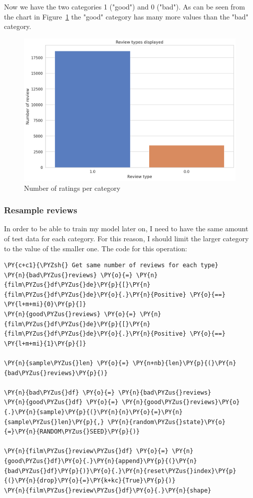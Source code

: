 Now we have the two categories 1 ("good") and 0 ("bad"). As can be seen from the chart in Figure~\ref{fig:fig_04}  the "good" category has many more values than the "bad" category.

\begin{figure}[H]
\centering
\includegraphics[width=1\textwidth]{images/output_43_1.png}
\caption{Number of ratings per category}
\label{fig:fig_04}
\end{figure}
\FloatBarrier
\subsubsection{Resample reviews}
\label{chap:resample}
In order to be able to train my model later on, I need to have the same amount of test data for each category. For this reason, I should limit the larger category to the value of the smaller one.
The code for this operation:
        \begin{tcolorbox}[breakable, size=fbox, boxrule=1pt, pad at break*=1mm,colback=cellbackground, colframe=cellborder]
\begin{Verbatim}[commandchars=\\\{\},fontsize=\footnotesize]
\PY{c+c1}{\PYZsh{} Get same number of reviews for each type}
\PY{n}{bad\PYZus{}reviews} \PY{o}{=} \PY{n}{film\PYZus{}df\PYZus{}de}\PY{p}{[}\PY{n}{film\PYZus{}df\PYZus{}de}\PY{o}{.}\PY{n}{Positive} \PY{o}{==} \PY{l+m+mi}{0}\PY{p}{]}
\PY{n}{good\PYZus{}reviews} \PY{o}{=} \PY{n}{film\PYZus{}df\PYZus{}de}\PY{p}{[}\PY{n}{film\PYZus{}df\PYZus{}de}\PY{o}{.}\PY{n}{Positive} \PY{o}{==} \PY{l+m+mi}{1}\PY{p}{]}

\PY{n}{sample\PYZus{}len} \PY{o}{=} \PY{n+nb}{len}\PY{p}{(}\PY{n}{bad\PYZus{}reviews}\PY{p}{)}

\PY{n}{bad\PYZus{}df} \PY{o}{=} \PY{n}{bad\PYZus{}reviews}
\PY{n}{good\PYZus{}df} \PY{o}{=} \PY{n}{good\PYZus{}reviews}\PY{o}{.}\PY{n}{sample}\PY{p}{(}\PY{n}{n}\PY{o}{=}\PY{n}{sample\PYZus{}len}\PY{p}{,} \PY{n}{random\PYZus{}state}\PY{o}{=}\PY{n}{RANDOM\PYZus{}SEED}\PY{p}{)}

\PY{n}{film\PYZus{}review\PYZus{}df} \PY{o}{=} \PY{n}{good\PYZus{}df}\PY{o}{.}\PY{n}{append}\PY{p}{(}\PY{n}{bad\PYZus{}df}\PY{p}{)}\PY{o}{.}\PY{n}{reset\PYZus{}index}\PY{p}{(}\PY{n}{drop}\PY{o}{=}\PY{k+kc}{True}\PY{p}{)}
\PY{n}{film\PYZus{}review\PYZus{}df}\PY{o}{.}\PY{n}{shape}
\end{Verbatim}
\end{tcolorbox}

